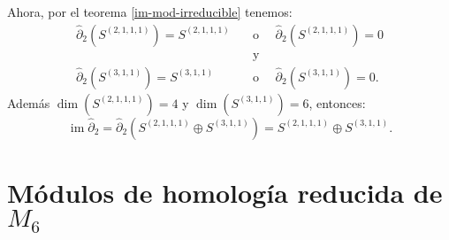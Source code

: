 \documentclass[12pt]{book}
\theoremstyle{definition}
\DeclareMathOperator{\im}{im}
\newcounter{in}
\begin{document}
Ahora, por el teorema \ref{im-mod-irreducible} tenemos:
\begin{align*}
\widehat\partial_{2}(S^{(2,1,1,1)})=S^{(2,1,1,1)} \quad & \mbox{o }\quad \widehat\partial_{2}(S^{(2,1,1,1)})=0\\
&\mbox{y}\\
\widehat\partial_{2}(S^{(3,1,1)})=S^{(3,1,1)} \quad & \mbox{o }\quad \widehat\partial_{2}(S^{(3,1,1)})=0.
\end{align*}
Además $\dim(S^{(2,1,1,1)})=4$ y $\dim(S^{(3,1,1)})=6$, entonces:
$$\im\widehat\partial_{2}=\widehat\partial_{2}(S^{(2,1,1,1)}\oplus S^{(3,1,1)})=S^{(2,1,1,1)}\oplus S^{(3,1,1)}.$$

\section{Módulos de homología reducida de $M_{6}$}
\label{hom-red-M6}
\end{document}
